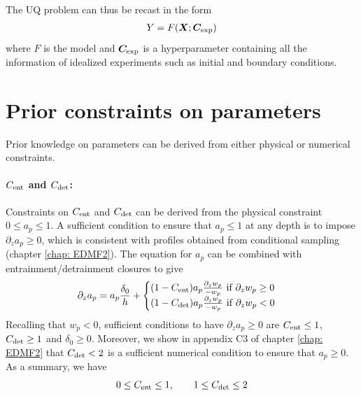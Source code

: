 \documentclass[draft]{agujournal2019}
\begin{document}
 The UQ problem can thus be recast in the form
 \begin{eqnarray}\label{eq: model}
    Y = F(\bm X ; \bm C_{\rm exp} )
 \end{eqnarray}
%
where $F$ is the model and $\bm C_{\rm exp}$ is a hyperparameter containing all the information of idealized experiments such as initial and boundary conditions. 
%
\section{Prior constraints on parameters}\label{sec: prior}
%
Prior knowledge  on parameters can be derived from either physical or numerical constraints.
%
\paragraph{$C_{\rm ent}$ and $C_{\rm det}$:}
%
Constraints on $C_{\rm ent}$ and $C_{\rm det}$ can be derived from the physical constraint $0\leq a_p \leq 1$. A sufficient condition to ensure that $a_p \leq 1$ at any depth is to impose $\partial_z a_p \geq 0$, which is consistent with profiles obtained from conditional sampling (chapter \ref{chap: EDMF2}). The equation for $a_p$ can be combined with entrainment/detrainment closures to give
%
\begin{eqnarray*}
    \partial_z a_p = a_p \frac{\delta_0}{h} + 
    \begin{cases}
        (1-C_{\rm ent}) a_p \frac{\partial_z w_p}{-w_p} \text{ if } \partial_z w_p \geq 0
        \\
        (1-C_{\rm det}) a_p \frac{\partial_z w_p}{-w_p} \text{ if } \partial_z w_p < 0             
    \end{cases}
\end{eqnarray*}
%
Recalling that $w_p<0$, sufficient conditions to have $\partial_z a_p \geq0$ are $C_{\rm ent} \leq 1$, $C_{\rm det} \geq 1$ and $\delta_0 \geq 0$. Moreover, we show in appendix C3 of chapter \ref{chap: EDMF2} that $C_{\rm det} <2$ is a sufficient numerical condition to ensure that $a_p \geq 0$. As a summary, we have
%
\begin{eqnarray*}
    0 \leq C_{\rm ent} \leq 1, \qquad 1 \leq C_{\rm det} \leq 2
\end{eqnarray*}
\end{document}
